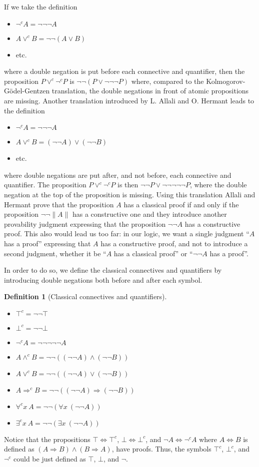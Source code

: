 \documentclass{article}
\newcommand{\fa}{\forall}
\newcommand{\ex}{\exists}
\newcommand{\topc}{\top^c}
\newcommand{\botc}{\bot^c}
\newcommand{\negc}{\neg^c}
\newcommand{\wedgec}{\wedge^c}
\newcommand{\veec}{\vee^c}
\newcommand{\Rightarrowc}{\Rightarrow^c}
\newcommand{\fac}{\fa^c}
\newcommand{\exc}{\ex^c}
\newtheorem{definition}{Definition}
\begin{document}
If we take the definition 
\begin{itemize}
\item $\negc A = \neg \neg \neg A$
\item $A \veec B = \neg \neg (A \vee B)$
\item etc.
\end{itemize}
where a double negation is put before each connective and
quantifier, then the proposition $P \veec \negc P$ is $\neg \neg
(P \vee \neg \neg \neg P)$ where, compared to 
the Kolmogorov-G\"odel-Gentzen translation, 
the double
negations in front of atomic propositions are missing.  
Another translation introduced by L. Allali and O. Hermant \cite{AH}
leads to the definition 
\begin{itemize}
\item $\negc A = \neg \neg \neg A$
\item $A \veec B = (\neg \neg A) \vee (\neg \neg B)$
\item etc.
\end{itemize}
where double negations are put after, and not before, each connective and
quantifier.
The proposition $P \veec \negc P$ is then $\neg \neg P \vee \neg \neg \neg \neg \neg P$,
where the double negation at the top of the proposition is missing.
Using this translation Allali and Hermant prove that the proposition
$A$ has a classical proof if and only if the proposition $\neg \neg
\|A\|$ has a constructive one and they introduce another provability
judgment expressing that the proposition $\neg \neg A$ has a
constructive proof. This also would lead us too far: in our logic, 
we want a single
judgment ``$A$ has a proof'' expressing that $A$ has a constructive
proof, and not to introduce a second judgment, whether it be ``$A$ has
a classical proof'' or ``$\neg \neg A$ has a proof''.

In order to do so, we define the classical connectives and quantifiers by
introducing double negations both before and after each symbol.
\begin{definition}[Classical connectives and quantifiers]~
\begin{itemize}
\item $\topc = \neg \neg \top$
\item $\botc = \neg \neg \bot$
\item $\negc A = \neg \neg \neg \neg \neg A$
\item $A \wedgec B = \neg \neg ((\neg \neg A) \wedge (\neg \neg B))$
\item $A \veec B = \neg \neg ((\neg \neg A) \vee (\neg \neg B))$
\item $A \Rightarrowc B = \neg \neg ((\neg \neg A) \Rightarrow (\neg \neg B))$
\item $\fac x~A = \neg \neg (\fa x~(\neg \neg A))$
\item $\exc x~A = \neg \neg (\ex x~(\neg \neg A))$
\end{itemize}
\end{definition}
Notice that the propositions 
$\top \Leftrightarrow \topc$, 
$\bot \Leftrightarrow \botc$, and
$\neg A \Leftrightarrow \negc A$
where $A \Leftrightarrow B$ is defined as 
$(A \Rightarrow B) \wedge (B \Rightarrow A)$, 
have proofs. Thus, the symbols $\topc$, $\botc$, and $\negc$ could be just 
defined as $\top$, $\bot$, and $\neg$.
\end{document}

